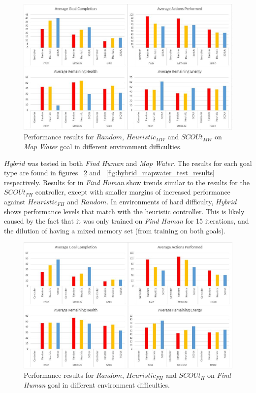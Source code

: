 \begin{figure}[h]
  \includegraphics[width=1.0\columnwidth]{Figures/Results/Experiment1/MapWater.JPG}
  \caption{Performance results for $Random$, $Heuristic_{MW}$ and $SCOUt_{MW}$ on \textit{Map Water} goal in different environment difficulties.}
  \label{fig:mapwater_test_results}
\end{figure}


$Hybrid$ was tested in both \textit{Find Human} and \textit{Map Water}.
The results for each goal type are found in figures ~\ref{fig:hybrid_findhuman_test_results} and ~\ref{fig:hybrid_mapwater_test_results} respectively.
Results for in \textit{Find Human} show trends similar to the results for the $SCOUt_{FH}$ controller, except with smaller margins of increased performance against $Heuristic_{FH}$ and $Random$.
In environments of hard difficulty, $Hybrid$ shows performance levels that match with the heuristic controller.
This is likely caused by the fact that it was only trained on \textit{Find Human} for 15 iterations, and the dilution of having a mixed memory set (from training on both goals).

\begin{figure}[h]
  \includegraphics[width=1.0\columnwidth]{Figures/Results/Experiment1/HybridFindHuman.JPG}
  \caption{Performance results for $Random$, $Heuristic_{FH}$ and $SCOUt_{H}$ on \textit{Find Human} goal in different environment difficulties.}
  \label{fig:hybrid_findhuman_test_results}
\end{figure}

